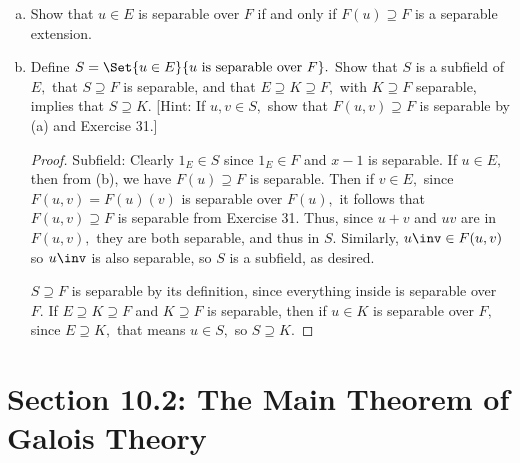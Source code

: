 \documentclass{article}
\begin{document}
\begin{itemize}
\begin{enumerate}[(a)]
			\item Show that $u\in E$ is separable over $F$ if and only if $F(u)\supseteq F$ is a separable extension.

			\item Define $S=\Set{u\in E}{u\text{ is separable over }F}.$ Show that $S$ is a subfield of $E,$ that $S\supseteq F$ is separable, and that $E\supseteq K\supseteq F,$ with $K\supseteq F$ separable, implies that $S\supseteq K.$ [Hint: If $u, v\in S,$ show that $F(u, v)\supseteq F$ is separable by (a) and Exercise 31.]
				\begin{proof}
					Subfield: Clearly $1_E\in S$ since $1_E\in F$ and $x-1$ is separable. If $u\in E,$ then from (b), we have $F(u)\supseteq F$ is separable. Then if $v\in E,$ since $F(u, v)=F(u)(v)$ is separable over $F(u),$ it follows that $F(u, v)\supseteq F$ is separable from Exercise 31. Thus, since $u+v$ and $uv$ are in $F(u, v),$ they are both separable, and thus in $S.$ Similarly, $u\inv\in F(u, v)$ so $u\inv$ is also separable, so $S$ is a subfield, as desired.

					$S\supseteq F$ is separable by its definition, since everything inside is separable over $F.$ If $E\supseteq K\supseteq F$ and $K\supseteq F$ is separable, then if $u\in K$ is separable over $F,$ since $E\supseteq K,$ that means $u\in S,$ so $S\supseteq K.$
				\end{proof}
				
		\end{enumerate}
		
\end{itemize}

\section*{Section 10.2: The Main Theorem of Galois Theory}
\end{document}
